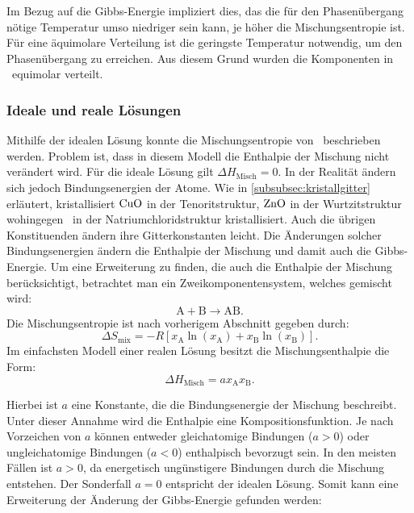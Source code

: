 Im Bezug auf die Gibbs-Energie impliziert dies, das die für den Phasenübergang nötige Temperatur umso niedriger sein
kann, je höher die Mischungsentropie ist.
Für eine äquimolare Verteilung ist die geringste Temperatur notwendig, um den Phasenübergang zu erreichen.
Aus diesem Grund wurden die Komponenten in \heo\ equimolar verteilt.

\subsubsection{Ideale und reale Lösungen}
Mithilfe der idealen Lösung konnte die Mischungsentropie von \heo\ beschrieben werden.
Problem ist, dass in diesem Modell die Enthalpie der Mischung nicht verändert wird.
Für die ideale Lösung gilt $\Delta H_\mathrm{Misch} = 0$.
In der Realität ändern sich jedoch Bindungsenergien der Atome.
Wie in \cref{subsubsec:kristallgitter} erläutert, kristallisiert $\ce{CuO}$ in der Tenoritstruktur, $\ce{ZnO}$ in der
Wurtzitstruktur wohingegen \heo\ in der Natriumchloridstruktur kristallisiert.
Auch die übrigen Konstituenden ändern ihre Gitterkonstanten leicht.
Die Änderungen solcher Bindungsenergien ändern die Enthalpie der Mischung und damit auch die Gibbs-Energie.
Um eine Erweiterung zu finden, die auch die Enthalpie der Mischung berücksichtigt, betrachtet man ein
Zweikomponentensystem, welches gemischt wird:
\begin{equation}
    \mathrm{A} + \mathrm{B} \longrightarrow \mathrm{AB}.
    \label{eq:reaktion}
\end{equation}
Die Mischungsentropie ist nach vorherigem Abschnitt gegeben durch:
\begin{equation}
    \Delta S_{\mathrm{mix}}=-R[x_{\mathrm{A}}\ln(x_{\mathrm{A}})+x_{\mathrm{B}}\ln(x_{\mathrm{B}})].
    \label{eq:Mischungsentropie3}
\end{equation}
Im einfachsten Modell einer realen Lösung besitzt die Mischungsenthalpie die Form:\autocite[8]{rost_phd}
\begin{equation}
    \Delta H_{\mathrm{Misch}}= a x_{\mathrm{A}} x_{\mathrm{B}}.
    \label{eq:Mischungsenthalpie}
\end{equation}

Hierbei ist $a$ eine Konstante, die die Bindungsenergie der Mischung beschreibt.
Unter dieser Annahme wird die Enthalpie eine Kompositionsfunktion.
Je nach Vorzeichen von $a$ können entweder gleichatomige Bindungen ($a > 0$) oder ungleichatomige Bindungen
($a < 0$) enthalpisch bevorzugt sein.
In den meisten Fällen ist $a > 0$, da energetisch ungünstigere Bindungen durch die Mischung entstehen.
Der Sonderfall $a=0$ entspricht der idealen Lösung.
Somit kann eine Erweiterung der Änderung der Gibbs-Energie gefunden werden:\autocite[9]{rost_phd}


